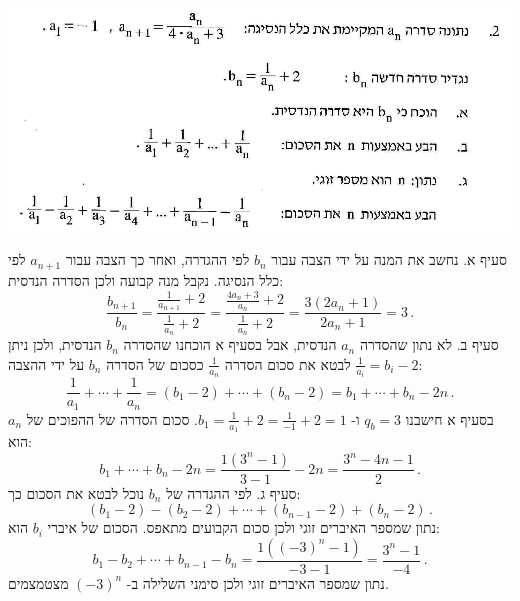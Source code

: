\documentclass[12pt,a4paper]{article}
\begin{document}
\begin{center}
\includegraphics[width=.95\textwidth]{winter-2017-2}
\end{center}
\vspace{-1ex}
סעיף א. נחשב את המנה על ידי הצבה עבור 
$b_n$
לפי ההגדרה, ואחר כך הצבה עבור 
$a_{n+1}$
לפי כלל הנסיגה. נקבל מנה קבועה ולכן הסדרה הנדסית:
\[
\frac{b_{n+1}}{b_n} = \frac{\displaystyle\frac{1}{a_{n+1}}+2}{\displaystyle\frac{1}{a_{n}}+2}= \frac{\displaystyle\frac{4a_n+3}{a_n}+2}{\displaystyle\frac{1}{a_{n}}+2}=\frac{3(2a_n+1)}{2a_n+1}=3\,.
\]
סעיף ב. לא נתון שהסדרה $a_n$ הנדסית, אבל בסעיף א הוכחנו שהסדרה  
$b_n$
הנדסית, ולכן ניתן לבטא את סכום הסדרה
$\displaystyle\frac{1}{a_n}$
כסכום של הסדרה
$b_n$
על ידי ההצבה 
$\displaystyle\frac{1}{a_i} = b_i - 2$:
\[
\frac{1}{a_1} + \cdots + \frac{1}{a_n}=(b_1-2) + \cdots + (b_n-2)=b_1+\cdots+b_n- 2n\,.
\]
בסעיף א חישבנו 
$q_b=3$
ו-%
$b_1=\displaystyle\frac{1}{a_1}+2=\displaystyle\frac{1}{-1}+2=1$.
סכום הסדרה של ההפוכים של 
$a_n$
הוא:
\[
b_1+\cdots+b_n- 2n=\frac{1(3^n-1)}{3-1} - 2n = \frac{3^n - 4n -1}{2}\,.
\]
סעיף ג. לפי ההגדרה של 
$b_n$
נוכל לבטא את הסכום כך:
\[
(b_1 - 2) - (b_2 - 2) + \cdots + (b_{n-1} - 2) + (b_n - 2)\,.
\]
נתון שמספר האיברים זוגי ולכן סכום הקבועים מתאפס. הסכום של איברי
$b_i$
הוא:
\[
b_1-b_2+\cdots+b_{n-1}-b_n=\frac{1((-3)^n-1)}{-3-1}=\frac{3^n-1}{-4}\,.
\]
נתון שמספר האיברים זוגי ולכן סימני השלילה ב-%
$(-3)^n$
מצטמצמים.

\bigskip

\textbf{}
\end{document}
